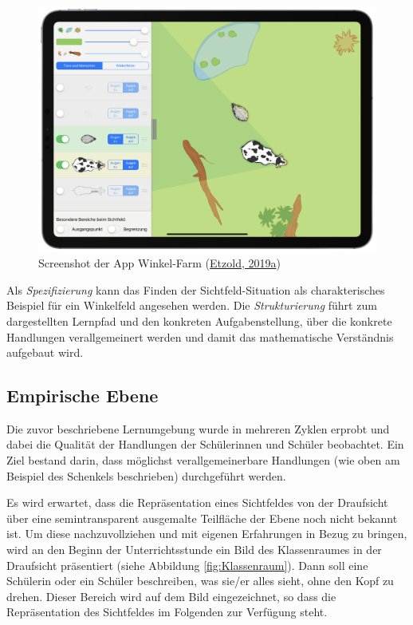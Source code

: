 \documentclass[
]{scrbook}
\theoremstyle{definition}
\theoremstyle{definition}
\theoremstyle{definition}
\theoremstyle{definition}
\theoremstyle{remark}
\begin{document}
\begin{figure}

{\centering \includegraphics[width=0.75\linewidth]{pictures/1-Winkelfarm} 

}

\caption{Screenshot der App Winkel-Farm (\protect\hyperlink{ref-Etzold:2019}{Etzold, 2019a})}\label{fig:WinkelfarmApp}
\end{figure}

Als \emph{Spezifizierung} kann das Finden der Sichtfeld-Situation als charakterisches Beispiel für ein Winkelfeld angesehen werden. Die \emph{Strukturierung} führt zum dargestellten Lernpfad und den konkreten Aufgabenstellung, über die konkrete Handlungen verallgemeinert werden und damit das mathematische Verständnis aufgebaut wird.

\hypertarget{empirische-ebene}{%
\subsection{Empirische Ebene}\label{empirische-ebene}}

Die zuvor beschriebene Lernumgebung wurde in mehreren Zyklen erprobt und dabei die Qualität der Handlungen der Schülerinnen und Schüler beobachtet. Ein Ziel bestand darin, dass möglichst verallgemeinerbare Handlungen (wie oben am Beispiel des Schenkels beschrieben) durchgeführt werden.

Es wird erwartet, dass die Repräsentation eines Sichtfeldes von der Draufsicht über eine semintransparent ausgemalte Teilfläche der Ebene noch nicht bekannt ist. Um diese nachzuvollziehen und mit eigenen Erfahrungen in Bezug zu bringen, wird an den Beginn der Unterrichtsstunde ein Bild des Klassenraumes in der Draufsicht präsentiert (siehe Abbildung \ref{fig:Klassenraum}). Dann soll eine Schülerin oder ein Schüler beschreiben, was sie/er alles sieht, ohne den Kopf zu drehen. Dieser Bereich wird auf dem Bild eingezeichnet, so dass die Repräsentation des Sichtfeldes im Folgenden zur Verfügung steht.
\end{document}
